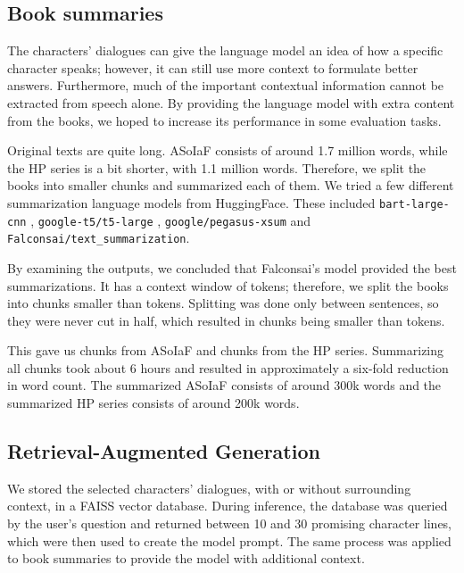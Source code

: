 \documentclass[fleqn,moreauthors,10pt]{ds_report}
\begin{document}
\subsection*{Book summaries}

The characters' dialogues can give the language model an idea of how a specific character speaks; however, it can still use more context to formulate better answers. Furthermore, much of the important contextual information cannot be extracted from speech alone. By providing the language model with extra content from the books, we hoped to increase its performance in some evaluation tasks.

Original texts are quite long. ASoIaF consists of around 1.7 million words, while the HP series is a bit shorter, with 1.1 million words. Therefore, we split the books into smaller chunks and summarized each of them. We tried a few different summarization language models from HuggingFace. These included
\texttt{bart-large-cnn} \cite{bart_large}, \texttt{google-t5/t5-large} \cite{2020t5}, \texttt{google/pegasus-xsum} \cite{zhang2019pegasus} and \texttt{Falconsai/\-text\_summarization}.

By examining the outputs, we concluded that Falconsai's model provided the best summarizations. It has a context window of   tokens; therefore, we split the books into chunks smaller than  tokens. Splitting was done only between sentences, so they were never cut in half, which resulted in chunks being smaller than  tokens.

This gave us  chunks from ASoIaF and  chunks from the HP series. Summarizing all  chunks took about 6 hours and resulted in approximately a six-fold reduction in word count. The summarized ASoIaF consists of around 300k words and the summarized HP series consists of around 200k words.

\subsection*{Retrieval-Augmented Generation}

We stored the selected characters' dialogues, with or without surrounding context, in a FAISS vector database. During inference, the database was queried by the user's question and returned between 10 and 30 promising character lines, which were then used to create the model prompt. The same process was applied to book summaries to provide the model with additional context.
\end{document}
